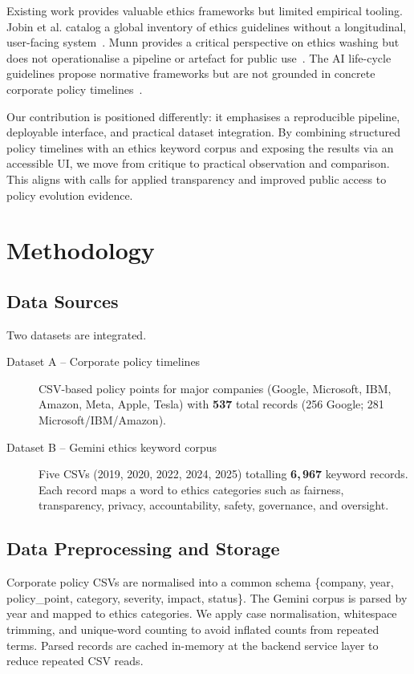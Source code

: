 \documentclass[conference]{IEEEtran}
\begin{document}
Existing work provides valuable ethics frameworks but limited empirical tooling.
Jobin et al. catalog a global inventory of ethics guidelines without a
longitudinal, user-facing system~\cite{jobin2019global}. Munn provides a
critical perspective on ethics washing but does not operationalise a pipeline
or artefact for public use~\cite{munn2023ethics}. The AI life-cycle guidelines
propose normative frameworks but are not grounded in concrete corporate policy
timelines~\cite{springer2022development}.

Our contribution is positioned differently: it emphasises a reproducible
pipeline, deployable interface, and practical dataset integration. By combining
structured policy timelines with an ethics keyword corpus and exposing the
results via an accessible UI, we move from critique to practical observation
and comparison. This aligns with calls for applied transparency and improved
public access to policy evolution evidence.

\section{Methodology}

\subsection*{Data Sources}
Two datasets are integrated.

\begin{description}
  \item[Dataset A -- Corporate policy timelines] CSV-based policy points for
  major companies (Google, Microsoft, IBM, Amazon, Meta, Apple, Tesla) with
  \textbf{537} total records (256 Google; 281 Microsoft/IBM/Amazon).
  \item[Dataset B -- Gemini ethics keyword corpus] Five CSVs (2019, 2020,
  2022, 2024, 2025) totalling \textbf{6,\,967} keyword records.
  Each record maps a word to ethics categories such as fairness,
  transparency, privacy, accountability, safety, governance, and oversight.
\end{description}

\subsection*{Data Preprocessing and Storage}
Corporate policy CSVs are normalised into a common schema
\{company, year, policy\_point, category, severity, impact, status\}. The Gemini
corpus is parsed by year and mapped to ethics categories. We apply case
normalisation, whitespace trimming, and unique-word counting to avoid inflated
counts from repeated terms. Parsed records are cached in-memory at the backend
service layer to reduce repeated CSV reads.
\end{document}
